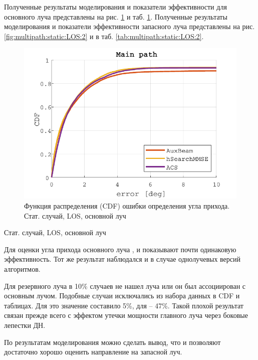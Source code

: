 Полученные результаты моделирования и показатели эффективности для основного
луча представлены на рис. \ref{fig:multipath:static:LOS:1}  и таб.
\ref{fig:multipath:static:LOS:1}. Полученные результаты моделирования и
показатели эффективности запасного луча представлены на рис.
\ref{fig:multipath:static:LOS:2} и в таб. \ref{tab:multipath:static:LOS:2}.
\begin{figure}[H]
  \centering
  \includegraphics{results/rus/multipath-static-LOS-1}
  \caption{Функция распределения (CDF) ошибки определения угла прихода. Стат. случай, LOS, основной луч}
  \label{fig:multipath:static:LOS:1}
\end{figure}
\begin{table}[H]
  \begin{center}
    \caption{Стат. случай, LOS, основной луч}
    \label{tab:multipath:static:LOS:1}
  \end{center}
\end{table}
Для оценки угла прихода основного луча \AuxBeam, \hSearchMMSE и \ACS показывают
почти одинаковую эффективность. Тот же результат
наблюдался и в случае однолучевых версий алгоритмов. 

Для резервного луча \hSearchMMSE в 10\% случаев не нашел луча или он был ассоциирован 
с основным лучом. Подобные случаи исключались из набора данных в CDF и таблицах.
Для \AuxBeam это значение составило 5\%, для \ACS -- 47\%. Такой плохой результат 
\ACS связан прежде всего с эффектом утечки мощности главного луча через 
боковые лепестки ДН. 

По результатам моделирования можно сделать вывод, что 
\AuxBeam и \hSearchMMSE позволяют достаточно хорошо оценить направление на 
запасной луч.  

